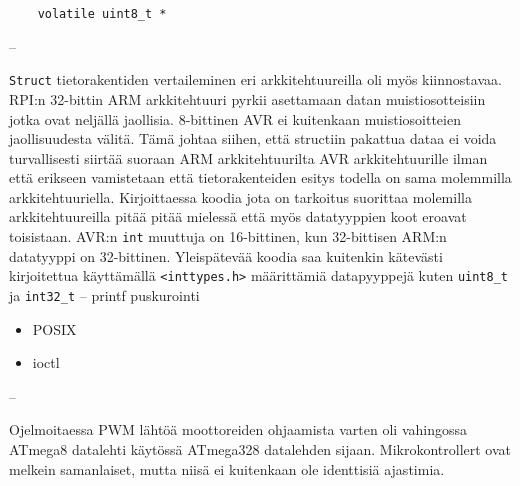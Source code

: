 \documentclass[]{article} %
\numberwithin{equation}{section}
\numberwithin{figure}{section}
\numberwithin{table}{section}
\begin{document}
\begin{verbatim}
    volatile uint8_t *
\end{verbatim}

--    

\verb+Struct+ tietorakentiden vertaileminen eri arkkitehtuureilla oli myös kiinnostavaa.
RPI:n 32-bittin ARM arkkitehtuuri pyrkii asettamaan datan muistiosotteisiin jotka ovat neljällä jaollisia. 8-bittinen AVR ei kuitenkaan muistiosoitteien jaollisuudesta välitä.
Tämä johtaa siihen, että structiin pakattua dataa ei voida turvallisesti siirtää suoraan ARM arkkitehtuurilta AVR arkkitehtuurille ilman että erikseen vamistetaan että tietorakenteiden esitys todella on sama molemmilla arkkitehtuuriella.
Kirjoittaessa koodia jota on tarkoitus suorittaa molemilla arkkitehtuureilla pitää pitää mielessä että myös datatyyppien koot eroavat toisistaan. AVR:n \verb+int+ muuttuja on 16-bittinen, kun 32-bittisen ARM:n datatyyppi on 32-bittinen.
Yleispätevää koodia saa kuitenkin kätevästi kirjoitettua käyttämällä \verb+<inttypes.h>+ määrittämiä datapyyppejä kuten \verb+uint8_t+ ja \verb+int32_t+
--
printf puskurointi

\begin{itemize}
    \item POSIX
    \item ioctl
    
\end{itemize}

  
--

Ojelmoitaessa PWM lähtöä moottoreiden ohjaamista varten oli vahingossa ATmega8 datalehti käytössä ATmega328 datalehden sijaan. Mikrokontrollert ovat melkein samanlaiset, mutta niisä ei kuitenkaan ole identtisiä ajastimia. 
\end{document}
